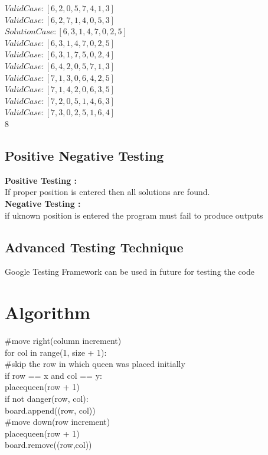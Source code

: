 \documentclass[a4paper,12pt]{article}
\begin{document}
				$Valid Case   : [6, 2, 0, 5, 7, 4, 1, 3]$\\
				$Valid Case   : [6, 2, 7, 1, 4, 0, 5, 3]$\\
				$Solution Case: [6, 3, 1, 4, 7, 0, 2, 5]$\\
				$Valid Case   : [6, 3, 1, 4, 7, 0, 2, 5]$\\
				$Valid Case   : [6, 3, 1, 7, 5, 0, 2, 4]$\\
				$Valid Case   : [6, 4, 2, 0, 5, 7, 1, 3]$\\
				$Valid Case   : [7, 1, 3, 0, 6, 4, 2, 5]$\\
				$Valid Case   : [7, 1, 4, 2, 0, 6, 3, 5]$\\
				$Valid Case   : [7, 2, 0, 5, 1, 4, 6, 3]$\\
				$Valid Case   : [7, 3, 0, 2, 5, 1, 6, 4]$\\
				8
				
				\subsection{Positive Negative Testing}
				
				\textbf{Positive Testing :}\\
				If proper position is entered then all solutions are found.\\
				\textbf{ Negative Testing :}\\
				if uknown position is entered the program must fail to produce outputs
				
				
				\subsection{Advanced Testing Technique}
				Google Testing Framework can be used in future for testing the code

\section{Algorithm}
        \#move right(column increment)\\
        for col in range(1, size + 1):\\
	        \#skip the row in which queen was placed initially\\
	        if row == x and col == y:\\
		        placequeen(row + 1)\\
	        if not danger(row, col):\\
		        board.append((row, col))\\
		        \#move down(row increment)\\
		        placequeen(row + 1)\\
		        board.remove((row,col))\\
\end{document}
